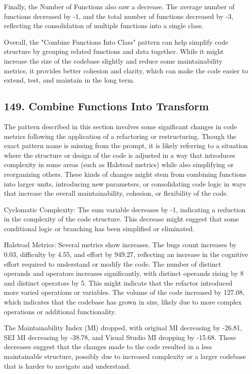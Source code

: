 Finally, the Number of Functions also saw a decrease. The average number of functions decreased by -1, and the total number of functions decreased by -3, reflecting the consolidation of multiple functions into a single class.

Overall, the "Combine Functions Into Class" pattern can help simplify code structure by grouping related functions and data together. While it might increase the size of the codebase slightly and reduce some maintainability metrics, it provides better cohesion and clarity, which can make the code easier to extend, test, and maintain in the long term.

\subsection{149. Combine Functions Into Transform}

The pattern described in this section involves some significant changes in code metrics following the application of a refactoring or restructuring. Though the exact pattern name is missing from the prompt, it is likely referring to a situation where the structure or design of the code is adjusted in a way that introduces complexity in some areas (such as Halstead metrics) while also simplifying or reorganizing others. These kinds of changes might stem from combining functions into larger units, introducing new parameters, or consolidating code logic in ways that increase the overall maintainability, cohesion, or flexibility of the code.

Cyclomatic Complexity: The sum variable decreases by -1, indicating a reduction in the complexity of the code structure. This decrease might suggest that some conditional logic or branching has been simplified or eliminated.

Halstead Metrics: Several metrics show increases. The bugs count increases by 0.03, difficulty by 4.55, and effort by 949.27, reflecting an increase in the cognitive effort required to understand or modify the code. The number of distinct operands and operators increases significantly, with distinct operands rising by 8 and distinct operators by 5. This might indicate that the refactor introduced more varied operations or variables. The volume of the code increased by 127.08, which indicates that the codebase has grown in size, likely due to more complex operations or additional functionality.

The Maintainability Index (MI) dropped, with original MI decreasing by -26.81, SEI MI decreasing by -38.78, and Visual Studio MI dropping by -15.68. These decreases suggest that the changes made to the code resulted in a less maintainable structure, possibly due to increased complexity or a larger codebase that is harder to navigate and understand.

